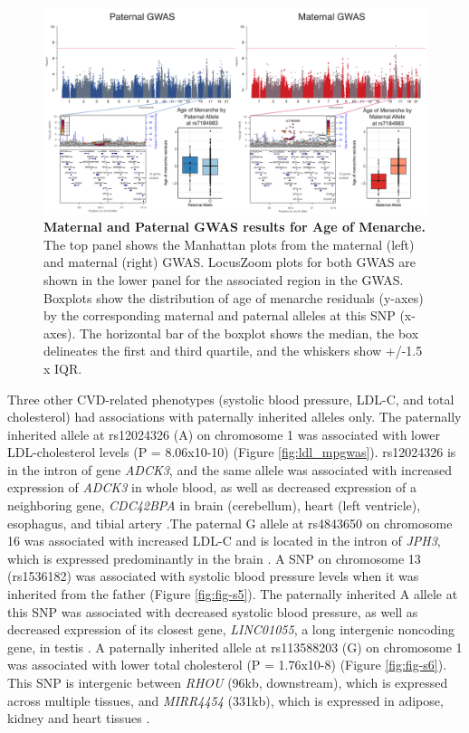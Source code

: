 \begin{figure}[!htb]
\centering \includegraphics[width=6in]{img/ch02/fig-01-menarche_matpatgwas.pdf}
\caption[Maternal and Paternal GWAS results for Age of Menarche.]{\textbf{Maternal and Paternal GWAS results for Age of Menarche.}  The top panel shows the Manhattan plots from the maternal (left) and maternal (right) GWAS. LocusZoom plots for both GWAS are shown in the lower panel for the associated region in the GWAS. Boxplots show the distribution of age of menarche residuals (y-axes) by the corresponding maternal and paternal alleles at this SNP (x-axes). The horizontal bar of the boxplot shows the median, the box delineates the first and third quartile, and the whiskers show +/-1.5 x IQR.}
\label{fig:menarche_mpgwas}
\end{figure}

Three other CVD-related phenotypes (systolic blood pressure, LDL-C, and total cholesterol) had associations with paternally inherited alleles only. The paternally inherited allele at rs12024326 (A) on chromosome 1 was associated with lower LDL-cholesterol levels (P = 8.06x10-10) (Figure \ref{fig:ldl_mpgwas}). rs12024326 is in the intron of gene \emph{ADCK3}, and the same allele was associated with increased expression of \emph{ADCK3} in whole blood, as well as decreased expression of a neighboring gene, \emph{CDC42BPA} in brain (cerebellum), heart (left ventricle), esophagus, and tibial artery \cite{Consortium2015}.The paternal G allele at rs4843650 on chromosome 16 was associated with increased LDL-C and is located in the intron of \emph{JPH3}, which is expressed predominantly in the brain \cite{Consortium2015}. A SNP on chromosome 13 (rs1536182) was associated with systolic blood pressure levels when it was inherited from the father (Figure \ref{fig:fig-s5}). The paternally inherited A allele at this SNP was associated with decreased systolic blood pressure, as well as decreased expression of its closest gene, \emph{LINC01055}, a long intergenic noncoding gene, in testis \cite{Consortium2015}. A paternally inherited allele at rs113588203 (G) on chromosome 1 was associated with lower total cholesterol (P = 1.76x10-8) (Figure \ref{fig:fig-s6}). This SNP is intergenic between \emph{RHOU} (96kb, downstream), which is expressed across multiple tissues, and \emph{MIRR4454} (331kb), which is expressed in adipose, kidney and heart tissues \cite{Consortium2015}. 


